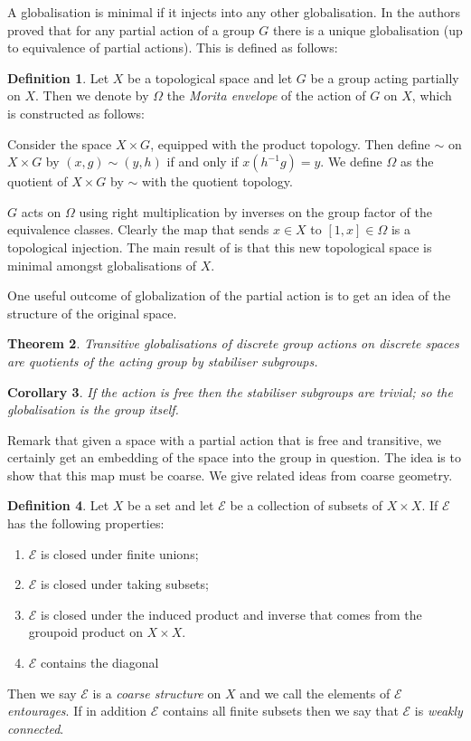 \documentclass[11pt,a4paper]{amsart}
\theoremstyle{plain}
\newtheorem{theorem}{Theorem}%
\newtheorem{corollary}[theorem]{Corollary}%
\theoremstyle{definition}%
\newtheorem{definition}[theorem]{Definition}%
\theoremstyle{remark}%
\begin{document}
A globalisation is minimal if it injects into any other globalisation. In \cite{MR2041539} the authors proved that for any partial action of a group $G$ there is a unique globalisation (up to equivalence of partial actions). This is defined as follows:

\begin{definition}
Let $X$ be a topological space and let $G$ be a group acting partially on $X$. Then we denote by $\Omega$ the \textit{Morita envelope} of the action of $G$ on $X$, which is constructed as follows:

Consider the space $X\times G$, equipped with the product topology. Then define $\sim$ on $X\times G$ by $(x,g)\sim (y,h)$ if and only if $x(h^{-1}g)=y$. We define $\Omega$ as the quotient of $X\times G$ by $\sim$ with the quotient topology. 

$G$ acts on $\Omega$ using right multiplication by inverses on the group factor of the equivalence classes. Clearly the map that sends $x \in X$ to $[1,x] \in \Omega$ is a topological injection. The main result of \cite{MR2041539} is that this new topological space is minimal amongst globalisations of $X$.
\end{definition}

One useful outcome of globalization of the partial action is to get an idea of the structure of the original space.

\begin{theorem}
Transitive globalisations of discrete group actions on discrete spaces are quotients of the acting group by stabiliser subgroups.
\end{theorem}

\begin{corollary}
If the action is free then the stabiliser subgroups are trivial; so the globalisation is the group itself.
\end{corollary}

Remark that given a space with a partial action that is free and transitive, we certainly get an embedding of the space into the group in question. The idea is to show that this map must be coarse. We give related ideas from coarse geometry.
\begin{definition}
Let $X$ be a set and let $\mathcal{E}$ be a collection of subsets of $X \times X$. If $\mathcal{E}$ has the following properties:
\begin{enumerate}
\item $\mathcal{E}$ is closed under finite unions;
\item $\mathcal{E}$ is closed under taking subsets;
\item $\mathcal{E}$ is closed under the induced product and inverse that comes from the groupoid product on $X \times X$.
\item $\mathcal{E}$ contains the diagonal
\end{enumerate}
Then we say $\mathcal{E}$ is a \textit{coarse structure} on $X$ and we call the elements of $\mathcal{E}$ \textit{entourages}. If in addition $\mathcal{E}$ contains all finite subsets then we say that $\mathcal{E}$ is \textit{weakly connected}.
\end{definition}
\end{document}
